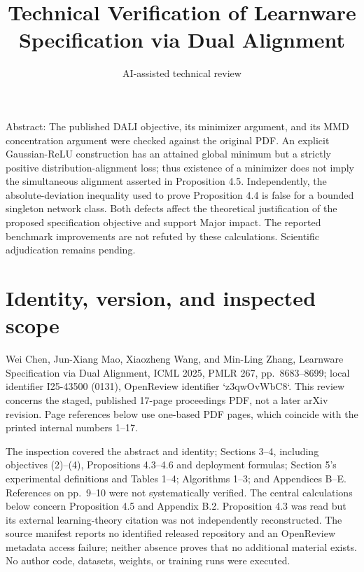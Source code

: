 \documentclass[10pt]{article}
\title{Technical Verification of
Learnware Specification via Dual Alignment}
\author{AI-assisted technical review}
\date{}
\begin{document}
\maketitle
Abstract: The published DALI objective, its minimizer argument, and its MMD concentration argument were checked against the original PDF. An explicit Gaussian-ReLU construction has an attained global minimum but a strictly positive distribution-alignment loss; thus existence of a minimizer does not imply the simultaneous alignment asserted in Proposition 4.5. Independently, the absolute-deviation inequality used to prove Proposition 4.4 is false for a bounded singleton network class. Both defects affect the theoretical justification of the proposed specification objective and support Major impact. The reported benchmark improvements are not refuted by these calculations. Scientific adjudication remains pending.\par
\section*{Identity, version, and inspected scope}
Wei Chen, Jun-Xiang Mao, Xiaozheng Wang, and Min-Ling Zhang, Learnware Specification via Dual Alignment, ICML 2025, PMLR 267, pp. 8683–8699; local identifier I25-43500 (0131), OpenReview identifier `z3qwOvWbC8`. This review concerns the staged, published 17-page proceedings PDF, not a later arXiv revision. Page references below use one-based PDF pages, which coincide with the printed internal numbers 1–17.\par
The inspection covered the abstract and identity; Sections 3–4, including objectives (2)–(4), Propositions 4.3–4.6 and deployment formulas; Section 5’s experimental definitions and Tables 1–4; Algorithms 1–3; and Appendices B–E. References on pp. 9–10 were not systematically verified. The central calculations below concern Proposition 4.5 and Appendix B.2. Proposition 4.3 was read but its external learning-theory citation was not independently reconstructed. The source manifest reports no identified released repository and an OpenReview metadata access failure; neither absence proves that no additional material exists. No author code, datasets, weights, or training runs were executed.\par
\end{document}
